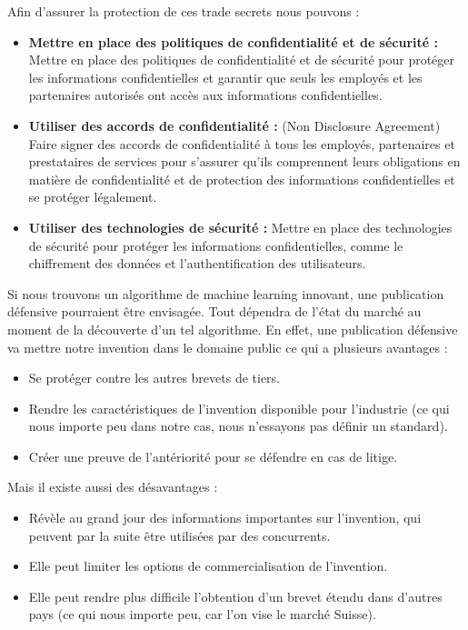 Afin d'assurer la protection de ces trade secrets nous pouvons :
 \begin{itemize}
     \item \textbf{Mettre en place des politiques de confidentialité et de sécurité :} Mettre en place des politiques de confidentialité et de sécurité pour protéger les informations confidentielles et garantir que seuls les employés et les partenaires autorisés ont accès aux informations confidentielles. \\
     \item \textbf{Utiliser des accords de confidentialité :} (Non Disclosure Agreement) Faire signer des accords de confidentialité à tous les employés, partenaires et prestataires de services pour s'assurer qu'ils comprennent leurs obligations en matière de confidentialité et de protection des informations confidentielles et se protéger légalement. \\
     \item \textbf{Utiliser des technologies de sécurité :} Mettre en place des technologies de sécurité pour protéger les informations confidentielles, comme le chiffrement des données et l'authentification des utilisateurs. \\
 \end{itemize}

 Si nous trouvons un algorithme de machine learning innovant, une publication défensive pourraient être envisagée. Tout dépendra de l'état du marché au moment de la découverte d'un tel algorithme. En effet, une publication défensive va mettre notre invention dans le domaine public ce qui a plusieurs avantages :
  \begin{itemize}
     \item Se protéger contre les autres brevets de tiers.
     \item Rendre les caractéristiques de l'invention disponible pour l'industrie (ce qui nous importe peu dans notre cas, nous n'essayons pas définir un standard).
     \item Créer une preuve de l'antériorité pour se défendre en cas de litige. \\
 \end{itemize}
 Mais il existe aussi des désavantages :
   \begin{itemize}
     \item Révèle au grand jour des informations importantes sur l'invention, qui peuvent par la suite être utilisées par des concurrents.
     \item Elle peut limiter les options de commercialisation de l'invention.
     \item Elle peut rendre plus difficile l'obtention d'un brevet étendu dans d'autres pays (ce qui nous importe peu, car l'on vise le marché Suisse). \\
 \end{itemize}

